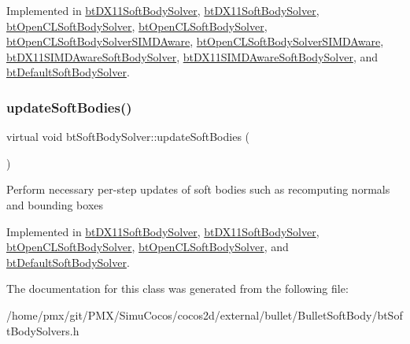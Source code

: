 Implemented in \hyperlink{classbtDX11SoftBodySolver_ab6477819156cdc0f5850514683b77f08}{bt\+D\+X11\+Soft\+Body\+Solver}, \hyperlink{classbtDX11SoftBodySolver_a4394232848404499b2a77fdf10336496}{bt\+D\+X11\+Soft\+Body\+Solver}, \hyperlink{classbtOpenCLSoftBodySolver_a24daba36a553aeb1d49158cd804e039a}{bt\+Open\+C\+L\+Soft\+Body\+Solver}, \hyperlink{classbtOpenCLSoftBodySolver_af418daf793b0cfe4d0af908e5cd43360}{bt\+Open\+C\+L\+Soft\+Body\+Solver}, \hyperlink{classbtOpenCLSoftBodySolverSIMDAware_a38d944c9dcaa0579e001f93da1b5244d}{bt\+Open\+C\+L\+Soft\+Body\+Solver\+S\+I\+M\+D\+Aware}, \hyperlink{classbtOpenCLSoftBodySolverSIMDAware_aac2e9d5582da958b0943b6e04f7f4c5a}{bt\+Open\+C\+L\+Soft\+Body\+Solver\+S\+I\+M\+D\+Aware}, \hyperlink{classbtDX11SIMDAwareSoftBodySolver_ae78972e067e72a8b5cb51ad05def50df}{bt\+D\+X11\+S\+I\+M\+D\+Aware\+Soft\+Body\+Solver}, \hyperlink{classbtDX11SIMDAwareSoftBodySolver_a952ce0e7cf089b1eee2db1f75319ec27}{bt\+D\+X11\+S\+I\+M\+D\+Aware\+Soft\+Body\+Solver}, and \hyperlink{classbtDefaultSoftBodySolver_a039cf1be486f6493be0983df3f4f1fbf}{bt\+Default\+Soft\+Body\+Solver}.

\mbox{\label{classbtSoftBodySolver_adac4b4f20eee46dc4fab26ed25be89ef}} 
\subsubsection{\texorpdfstring{update\+Soft\+Bodies()}{updateSoftBodies()}}
{\footnotesize\ttfamily virtual void bt\+Soft\+Body\+Solver\+::update\+Soft\+Bodies (\begin{DoxyParamCaption}{ }\end{DoxyParamCaption})\hspace{0.3cm}{\ttfamily [pure virtual]}}

Perform necessary per-\/step updates of soft bodies such as recomputing normals and bounding boxes 

Implemented in \hyperlink{classbtDX11SoftBodySolver_a14550caa4b6eb1be4c47cef4a4b40336}{bt\+D\+X11\+Soft\+Body\+Solver}, \hyperlink{classbtDX11SoftBodySolver_a2b96a99eb97d2ae1fc9235bba8cb70ce}{bt\+D\+X11\+Soft\+Body\+Solver}, \hyperlink{classbtOpenCLSoftBodySolver_ae37f7bd6f4ab0c4b8eb26fb1c104644a}{bt\+Open\+C\+L\+Soft\+Body\+Solver}, \hyperlink{classbtOpenCLSoftBodySolver_a557948307d1eb34fa1af3d091ca243ab}{bt\+Open\+C\+L\+Soft\+Body\+Solver}, and \hyperlink{classbtDefaultSoftBodySolver_a28c27dd170396900b6e79379d5781610}{bt\+Default\+Soft\+Body\+Solver}.



The documentation for this class was generated from the following file\+:\begin{DoxyCompactItemize}
\item 
/home/pmx/git/\+P\+M\+X/\+Simu\+Cocos/cocos2d/external/bullet/\+Bullet\+Soft\+Body/bt\+Soft\+Body\+Solvers.\+h\end{DoxyCompactItemize}

